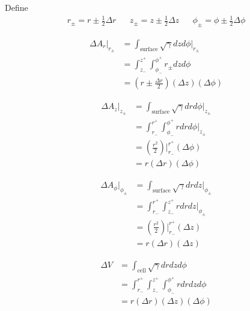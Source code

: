Define
\begin{align}
&r_\pm = r \pm \frac{1}{2}\Delta r&
&z_\pm = z \pm \frac{1}{2}\Delta z& 
&\phi_\pm = \phi \pm \frac{1}{2}\Delta \phi &
\end{align}

\begin{align}
\Delta A_r\Big|_{r_\pm} &= \int_{\text{surface}} \sqrt{\gamma} dz d\phi  \Big|_{r_\pm} \\
         &= \int_{z_-}^{z^+} \int_{\phi_-}^{\phi^+} r_\pm dz d\phi \\
         &= \left( r \pm \frac{\Delta r}{2} \right) \left( \Delta z \right) \left( \Delta \phi \right)
\end{align}

\begin{align}
\Delta A_z \Big|_{z_\pm} &= \int_{\text{surface}} \sqrt{\gamma} dr d\phi  \Big|_{z_\pm} \\
         &= \int_{r_-}^{r^+} \int_{\phi_-}^{\phi^+} r dr d\phi  \Big|_{z_\pm} \\
         &= \left( \frac{r^2}{2} \right)\Big|_{r_-}^{r^+}  \left( \Delta \phi \right)\\
         &=  r \left( \Delta r \right) \left( \Delta \phi \right)
\end{align}

\begin{align}
\Delta A_\phi \Big|_{\phi_\pm} &= \int_{\text{surface}} \sqrt{\gamma} dr dz  \Big|_{\phi_\pm} \\
         &= \int_{r_-}^{r^+} \int_{z_-}^{z^+} r dr dz  \Big|_{\phi_\pm} \\
         &= \left( \frac{r^2}{2} \right)\Big|_{r_-}^{r^+}  \left( \Delta z \right)\\
         &=  r \left( \Delta r \right) \left( \Delta z \right)
\end{align}

\begin{align}
\Delta V &= \int_{\text{cell}} \sqrt{\gamma} dr dz d\phi \\
         &= \int_{r_-}^{r^+} \int_{z_-}^{z^+} \int_{\phi_-}^{\phi^+} r dr dz d\phi \\
         &=  r \left( \Delta r \right) \left( \Delta z \right) \left( \Delta \phi \right)
\end{align}

